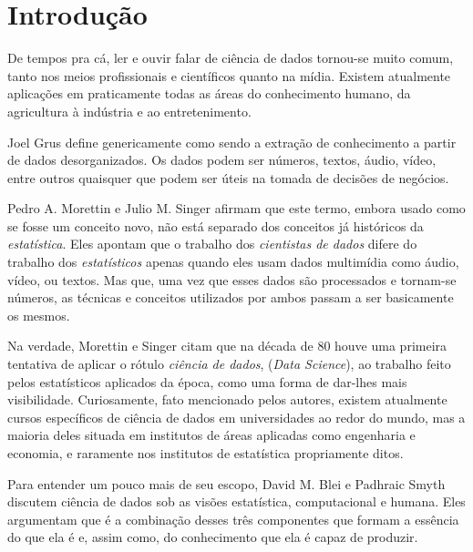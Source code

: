 
\chapter{Introdução}
\label{cap:introducao}


De tempos pra cá, ler e ouvir falar de ciência de dados tornou-se muito comum, tanto nos meios profissionais e científicos quanto na mídia. Existem atualmente aplicações em praticamente todas as áreas do conhecimento humano, da agricultura à indústria e ao entretenimento.

Joel Grus \citep{data} define genericamente  como sendo a extração de conhecimento a partir de dados desorganizados. Os dados podem ser números, textos, áudio, vídeo, entre outros quaisquer que podem ser úteis na tomada de decisões de negócios.

Pedro A. Morettin e Julio M. Singer \citep{apostila} afirmam que este termo, embora usado como se fosse um conceito novo, não está separado dos conceitos já históricos da \emph{estatística}. Eles apontam que o trabalho dos \emph{cientistas de dados} difere do trabalho dos \emph{estatísticos} apenas quando eles usam dados multimídia como áudio, vídeo, ou textos. Mas que, uma vez que esses dados são processados e tornam-se números, as técnicas e conceitos utilizados por ambos passam a ser basicamente os mesmos.

Na verdade, Morettin e Singer \citep{apostila} citam que na década de 80 houve uma primeira tentativa de aplicar o rótulo \emph{ciência de dados}, (\emph{Data Science}), ao trabalho feito pelos estatísticos aplicados da época, como uma forma de dar-lhes mais visibilidade. Curiosamente, fato mencionado pelos autores, existem atualmente cursos específicos de ciência de dados em universidades ao redor do mundo, mas a maioria deles situada em institutos de áreas aplicadas como engenharia e economia, e raramente nos institutos de estatística propriamente ditos.

Para entender um pouco mais de seu escopo, David M. Blei e Padhraic Smyth \citep{blei} discutem ciência de dados sob as visões estatística, computacional e humana. Eles argumentam que é a combinação desses três componentes que formam a essência do que ela é e, assim como, do conhecimento que ela é capaz de produzir.

